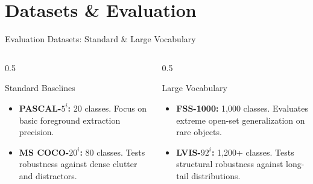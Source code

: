 \documentclass[aspectratio=169, 10pt]{beamer}
\begin{document}
\section{Datasets \& Evaluation}

\begin{frame}{Evaluation Datasets: Standard \& Large Vocabulary}
    \begin{columns}[T]
        \begin{column}{0.5\textwidth}
            \begin{block}{Standard Baselines}
                \small
                \begin{itemize}
                    \item \textbf{PASCAL-$5^i$:} 20 classes. Focus on basic foreground extraction precision.
                    \item \textbf{MS COCO-$20^i$:} 80 classes. Tests robustness against dense clutter and distractors.
                \end{itemize}
            \end{block}
        \end{column}
        \begin{column}{0.5\textwidth}
            \begin{block}{Large Vocabulary}
                \small
                \begin{itemize}
                    \item \textbf{FSS-1000:} 1,000 classes. Evaluates extreme open-set generalization on rare objects.
                    \item \textbf{LVIS-$92^i$:} 1,200+ classes. Tests structural robustness against long-tail distributions.
                \end{itemize}
            \end{block}
        \end{column}
    \end{columns}
\end{frame}
\end{document}
